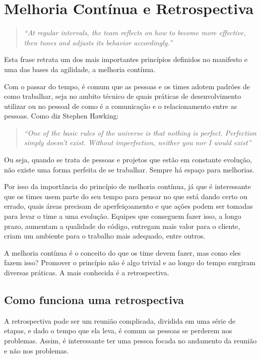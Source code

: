 \section{Melhoria Contínua e Retrospectiva}

\begin{quote}
\textit{``At regular intervals, the team reflects on how to become more effective, then tunes and adjusts its behavior accordingly.''}~\cite{manifesto}
\end{quote}

Esta frase retrata um dos mais importantes princípios definidos no manifesto e uma das bases da agilidade, a melhoria contínua. 

Com o passar do tempo, é comum que as pessoas e os times adotem padrões de como trabalhar, seja no ambito técnico de quais práticas de desenvolvimento utilizar ou no pessoal de como é a comunicação e o relacionamento entre as pessoas. Como diz Stephen Hawking:

\begin{quote}
\textit{``One of the basic rules of the universe is that nothing is perfect. Perfection simply doesn't exist. Without imperfection, neither you nor I would exist''}
\end{quote}

Ou seja, quando se trata de pessoas e projetos que estão em constante evolução, não existe uma forma perfeita de se trabalhar. Sempre há espaço para melhorias.

Por isso da importância do princípio de melhoria contínua, já que é interessante que os times usem parte do seu tempo para pensar no que está dando certo ou errado, quais áreas precisam de aperfeiçoamento e que ações podem ser tomadas para levar o time a uma evolução. Equipes que conseguem fazer isso, a longo prazo, aumentam a qualidade do código, entregam mais valor para o cliente, criam um ambiente para o trabalho mais adequado, entre outros.

A melhoria contínua é o conceito do que os time devem fazer, mas como eles fazem isso? Promover o princípio não é algo trivial e ao longo do tempo surgiram diversas práticas. A mais conhecida é a retrospectiva.

\subsection{Como funciona uma retrospectiva}

A retrospectiva pode ser um reunião complicada, dividida em uma série de etapas, e dado o tempo que ela leva, é comum as pessoas se perderem nos problemas. Assim, é interessante ter uma pessoa focada no andamento da reunião e não nos problemas. 

